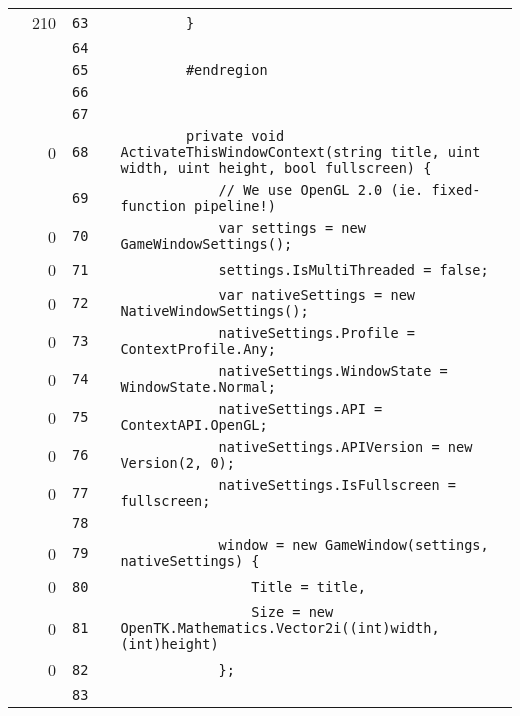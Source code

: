 \documentclass[a4paper,landscape,10pt]{article}
\begin{document}
\begin{longtable}[l]{lrrll}
\cellcolor{green} & 210 & \verb~63~ & & \verb~        }~\\
\cellcolor{gray} &  & \verb~64~ & & \verb~~\\
\cellcolor{gray} &  & \verb~65~ & & \verb~        #endregion~\\
\cellcolor{gray} &  & \verb~66~ & & \verb~~\\
\cellcolor{gray} &  & \verb~67~ & & \verb~~\\
\cellcolor{red} & 0 & \verb~68~ & & \verb~        private void ActivateThisWindowContext(string title, uint width, uint height, bool fullscreen) {~\\
\cellcolor{gray} &  & \verb~69~ & & \verb~            // We use OpenGL 2.0 (ie. fixed-function pipeline!)~\\
\cellcolor{red} & 0 & \verb~70~ & & \verb~            var settings = new GameWindowSettings();~\\
\cellcolor{red} & 0 & \verb~71~ & & \verb~            settings.IsMultiThreaded = false;~\\
\cellcolor{red} & 0 & \verb~72~ & & \verb~            var nativeSettings = new NativeWindowSettings();~\\
\cellcolor{red} & 0 & \verb~73~ & & \verb~            nativeSettings.Profile = ContextProfile.Any;~\\
\cellcolor{red} & 0 & \verb~74~ & & \verb~            nativeSettings.WindowState = WindowState.Normal;~\\
\cellcolor{red} & 0 & \verb~75~ & & \verb~            nativeSettings.API = ContextAPI.OpenGL;~\\
\cellcolor{red} & 0 & \verb~76~ & & \verb~            nativeSettings.APIVersion = new Version(2, 0);~\\
\cellcolor{red} & 0 & \verb~77~ & & \verb~            nativeSettings.IsFullscreen = fullscreen;~\\
\cellcolor{gray} &  & \verb~78~ & & \verb~~\\
\cellcolor{red} & 0 & \verb~79~ & & \verb~            window = new GameWindow(settings, nativeSettings) {~\\
\cellcolor{red} & 0 & \verb~80~ & & \verb~                Title = title,~\\
\cellcolor{red} & 0 & \verb~81~ & & \verb~                Size = new OpenTK.Mathematics.Vector2i((int)width, (int)height)~\\
\cellcolor{red} & 0 & \verb~82~ & & \verb~            };~\\
\cellcolor{gray} &  & \verb~83~ & & \verb~~\\

\end{longtable}
\end{document}
